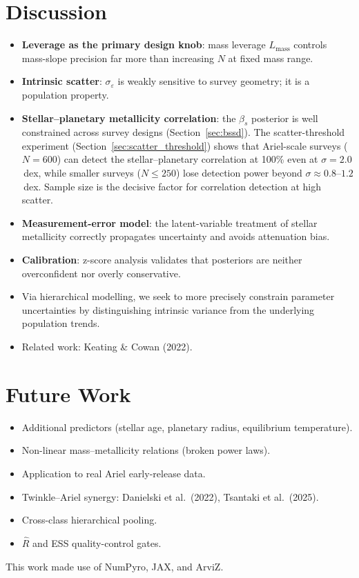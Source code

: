 \documentclass[twocolumn]{aastex631}
\begin{document}
\section{Discussion}\label{sec:discussion}

\begin{itemize}
    \item \textbf{Leverage as the primary design knob}: mass leverage
          $L_{\mathrm{mass}}$ controls mass-slope precision far more
          than increasing $N$ at fixed mass range.
    \item \textbf{Intrinsic scatter}: $\sigma_\varepsilon$ is weakly
          sensitive to survey geometry; it is a population property.
    \item \textbf{Stellar--planetary metallicity correlation}:
          the $\beta_s$ posterior is well constrained across
          survey designs (Section~\ref{sec:bssd}). The
          scatter-threshold experiment
          (Section~\ref{sec:scatter_threshold}) shows that
          Ariel-scale surveys ($N = 600$) can detect the
          stellar--planetary correlation at 100\% even at
          $\sigma = 2.0$\,dex, while smaller surveys
          ($N \leq 250$) lose detection power beyond
          $\sigma \approx 0.8$--$1.2$\,dex. Sample size is the
          decisive factor for correlation detection at high scatter.
    \item \textbf{Measurement-error model}: the latent-variable
          treatment of stellar metallicity correctly propagates
          uncertainty and avoids attenuation bias.
    \item \textbf{Calibration}: z-score analysis validates that
          posteriors are neither overconfident nor overly conservative.
    \item Via hierarchical modelling, we seek to more precisely
          constrain parameter uncertainties by distinguishing intrinsic
          variance from the underlying population trends.
    \item Related work: Keating \& Cowan (2022).
\end{itemize}

\section{Future Work}\label{sec:future}

\begin{itemize}
    \item Additional predictors (stellar age, planetary radius,
          equilibrium temperature).
    \item Non-linear mass--metallicity relations (broken power laws).
    \item Application to real Ariel early-release data.
    \item Twinkle--Ariel synergy: Danielski et al.\ (2022),
          Tsantaki et al.\ (2025).
    \item Cross-class hierarchical pooling.
    \item $\hat{R}$ and ESS quality-control gates.
\end{itemize}

\begin{acknowledgments}
This work made use of NumPyro, JAX, and ArviZ.
\end{acknowledgments}
\end{document}

